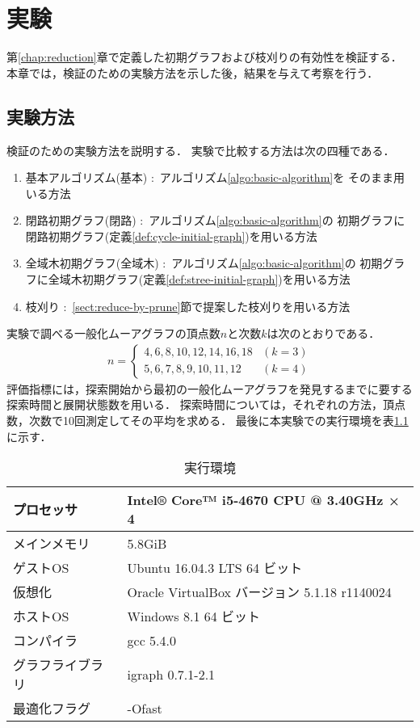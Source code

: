 
\chapter{実験}
\label{sect:experiment}
第\ref{chap:reduction}章で定義した初期グラフおよび枝刈りの有効性を検証する．
本章では，検証のための実験方法を示した後，結果を与えて考察を行う．

\section{実験方法}
検証のための実験方法を説明する．
実験で比較する方法は次の四種である．
\begin{enumerate}
\item 基本アルゴリズム(基本) :\ アルゴリズム\ref{algo:basic-algorithm}を
  そのまま用いる方法
\item 閉路初期グラフ(閉路) :\ アルゴリズム\ref{algo:basic-algorithm}の
  初期グラフに閉路初期グラフ(定義\ref{def:cycle-initial-graph})を用いる方法
\item 全域木初期グラフ(全域木) :\ アルゴリズム\ref{algo:basic-algorithm}の
  初期グラフに全域木初期グラフ(定義\ref{def:stree-initial-graph})を用いる方法
\item 枝刈り :\ \ref{sect:reduce-by-prune}節で提案した枝刈りを用いる方法
\end{enumerate}
実験で調べる一般化ムーアグラフの頂点数$n$と次数$k$は次のとおりである．
\begin{equation*}
  \begin{aligned}
    n=\begin{cases}
      4,6,8,10,12,14,16,18 & (k=3) \\
      5,6,7,8,9,10,11,12 & (k=4)
    \end{cases}
  \end{aligned}
\end{equation*}
評価指標には，探索開始から最初の一般化ムーアグラフを発見するまでに要する
探索時間と展開状態数を用いる．
探索時間については，それぞれの方法，頂点数，次数で10回測定してその平均を求める．
最後に本実験での実行環境を表\ref{tab:env-lab}に示す．
\begin{table}
  \caption{実行環境}
  \label{tab:env-lab}
  \centering
  \begin{tabular}{ll}
    \hline
    プロセッサ & Intel® Core™ i5-4670 CPU @ 3.40GHz × 4 \\ \hline
    メインメモリ & 5.8GiB \\ \hline
    ゲストOS & Ubuntu 16.04.3 LTS 64 ビット \\ \hline
    仮想化 & Oracle VirtualBox バージョン 5.1.18 r1140024 \\ \hline
    ホストOS & Windows 8.1 64 ビット \\ \hline
    コンパイラ & gcc 5.4.0 \\ \hline
    グラフライブラリ & igraph 0.7.1-2.1 \\ \hline
    最適化フラグ & -Ofast \\ \hline
  \end{tabular}
\end{table}

